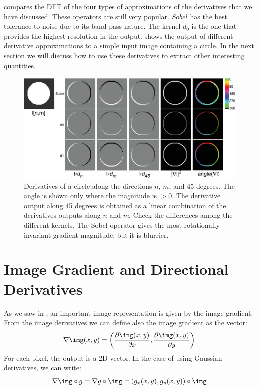 \Fig{\ref{fig:DFTderivativeoperators}} compares the DFT of the four types of approximations of the derivatives that we have discussed. These operators are still very popular. $Sobel$ has the best tolerance to noise due to its band-pass nature. The kernel $d_0$ is the one that provides the highest resolution in the output. \Fig{\ref{fig:circle}} shows the output of different derivative approximations to a simple input image containing a circle. In the next section we will discuss how to use these derivatives to extract other interesting quantities.


\begin{figure}[t]
	\centerline{
		\includegraphics[width=1\linewidth]{figures/spatial_filters/circle.eps}}
	\caption{Derivatives of a circle along the directions $n$, $m$, and 45 degrees.
		The angle is shown only where the magnitude is $>0$. The derivative output along 45 degrees is obtained as a linear combination of the derivatives outputs along $n$ and $m$. Check the differences among the different kernels. The Sobel operator gives the most rotationally invariant gradient magnitude, but it is blurrier.
	}
	\label{fig:circle}
\end{figure}

\section{Image Gradient and Directional Derivatives}

As we saw in \chap{\ref{chapter:simplesystem}}, an important image representation is given by the image gradient. From the image derivatives we can define also the image gradient as the vector:
\begin{equation}
	\nabla \img (x,y) = \left( \frac{\partial \img(x,y)}{\partial x}, \frac{\partial \img(x,y)}{\partial y} \right)
\end{equation}
For each pixel, the output is a 2D vector.  In the case of using Gaussian derivatives, we can write:
\begin{equation}
	\nabla \img \circ g = \nabla g \circ \img = \left( g_x(x,y), g_y(x,y) \right) \circ \img
\end{equation}

